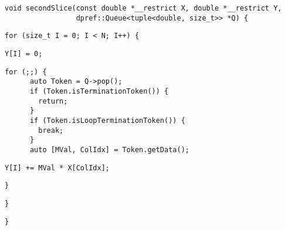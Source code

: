 \begin{lstlisting}[style=cppcode]
void secondSlice(const double *__restrict X, double *__restrict Y,
                 dpref::Queue<tuple<double, size_t>> *Q) {
\end{lstlisting}\vspace{-\baselineskip}

\begin{lstlisting}[style=cppcode, backgroundcolor=\color{yellow!15}, firstnumber=last]
  for (size_t I = 0; I < N; I++) {
\end{lstlisting}\vspace{-\baselineskip}

\begin{lstlisting}[style=cppcode, backgroundcolor=\color{green!15}, firstnumber=last]
    Y[I] = 0;
\end{lstlisting}\vspace{-\baselineskip}

\begin{lstlisting}[style=cppcode, firstnumber=last]
    for (;;) {
      auto Token = Q->pop();
      if (Token.isTerminationToken()) {
        return;
      }
      if (Token.isLoopTerminationToken()) {
        break;
      }
      auto [MVal, ColIdx] = Token.getData();
\end{lstlisting}\vspace{-\baselineskip}

\begin{lstlisting}[style=cppcode, backgroundcolor=\color{green!15}, firstnumber=last]
      Y[I] += MVal * X[ColIdx];
\end{lstlisting}\vspace{-\baselineskip}

\begin{lstlisting}[style=cppcode, firstnumber=last]
    }
\end{lstlisting}\vspace{-\baselineskip}

\begin{lstlisting}[style=cppcode, backgroundcolor=\color{yellow!15}, firstnumber=last]
  }
\end{lstlisting}\vspace{-\baselineskip}

\begin{lstlisting}[style=cppcode, firstnumber=last]
}
\end{lstlisting}\vspace{-\baselineskip}
